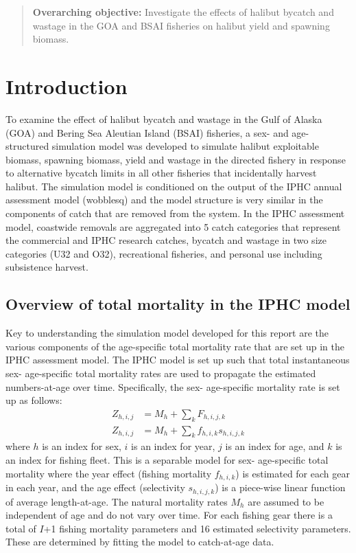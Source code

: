 

\begin{quote}
\textbf{Overarching objective:} Investigate the effects of halibut bycatch and wastage in the GOA and BSAI fisheries on halibut yield and spawning biomass.	
\end{quote}


\section{Introduction} %
\label{cha:introduction}

To examine the effect of halibut bycatch and wastage in the Gulf of Alaska (GOA) and Bering Sea Aleutian Island (BSAI) fisheries, a sex- and age-structured simulation model was developed to simulate halibut exploitable biomass, spawning biomass, yield and wastage in the directed fishery in response to alternative bycatch limits in all other fisheries that incidentally harvest halibut.  The simulation model is conditioned on the output of the IPHC annual assessment model (wobblesq) and the model structure is very similar in the components of catch that are removed from the system. In the IPHC assessment model, coastwide removals are aggregated into 5 catch categories that represent the commercial and IPHC research catches, bycatch and wastage in two size categories (U32 and O32), recreational fisheries, and personal use including subsistence harvest.  

\subsection{Overview of total mortality in the IPHC model} %
\label{sub:overview_of_the_iphc_model}

Key to understanding the simulation model developed for this report are the various components of the age-specific total mortality rate that are set up in the IPHC assessment model.  The IPHC model is set up such that total instantaneous sex- age-specific total mortality rates are used to propagate the estimated numbers-at-age over time.  Specifically, the sex- age-specific mortality rate is set up as follows:
\begin{align*}
	Z_{h,i,j} &= M_h + \sum_k F_{h,i,j,k}\\
	Z_{h,i,j} &= M_h + \sum_k f_{h,i,k} s_{h,i,j,k}
\end{align*}
where $h$ is an index for sex, $i$ is an index for year, $j$ is an index for age, and $k$ is an index for fishing fleet.  This is a separable model for sex- age-specific total mortality where the year effect (fishing mortality $f_{h,i,k}$) is estimated for each gear in each year, and the age effect (selectivity $s_{h,i,j,k}$) is a piece-wise linear function of average length-at-age. The natural mortality rates $M_h$ are assumed to be independent of age and do not vary over time.  For each fishing gear there is a total of $I$+1 fishing mortality parameters and  16 estimated selectivity parameters.  These are determined by fitting the model to catch-at-age data.

